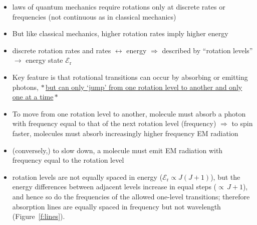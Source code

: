 \documentclass[11pt, oneside]{article}
\begin{document}
\begin{itemize}
\begin{itemize}
\begin{itemize}
\begin{itemize}
				\item[$\hookrightarrow$] laws of quantum mechanics require rotations only at discrete rates or frequencies (not continuous as in classical mechanics)
				\item[$\hookrightarrow$] But like classical mechanics, higher rotation rates imply higher energy
				\item[$\hookrightarrow$] discrete rotation rates and rates $\leftrightarrow$ energy $\Rightarrow$ described by ``rotation levels'' $\rightarrow$ energy state $\mathcal{E}_\mathrm{r}$
				\item[$\hookrightarrow$] Key feature is that rotational transitions can occur by absorbing or emitting photons, $*$\,\underline{but can only `jump' from one rotation level to another and only one at a time}\,$*$
				\item[$\hookrightarrow$] To move from one rotation level to another, molecule must absorb a photon with frequency equal to that of the next rotation level (frequency) $\Rightarrow$ to spin faster, molecules must absorb increasingly higher frequency EM radiation
				\item[$\hookrightarrow$] (conversely,) to slow down, a molecule must emit EM radiation with frequency equal to the rotation level
				\item[$\hookrightarrow$] rotation levels are not equally spaced in energy ($\mathcal{E}_\mathrm{r} \propto J(J+1)$), but the energy differences between adjacent levels increase in equal steps (${\propto}\,J+1$), and hence so do the frequencies of the allowed one-level transitions; therefore absorption lines are equally spaced in frequency but not wavelength (Figure~\ref{f:lines}).


\end{itemize}
\end{itemize}
\end{itemize}
\end{itemize}
\end{document}
